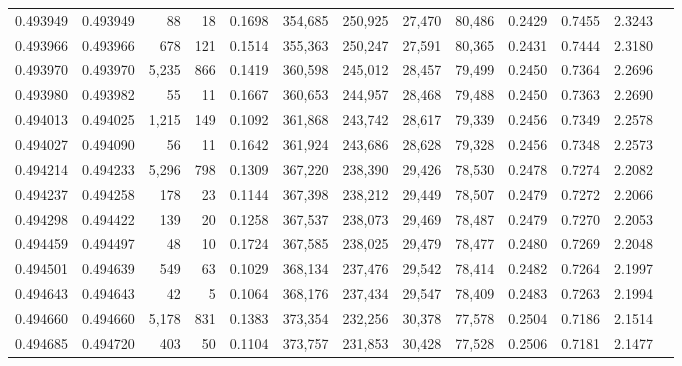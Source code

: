 \begin{tabular}{rrrrrrrrrrrrr}
0.493949 & 0.493949 &    88 &    18 &                                     0.1698 & 354,685 & 250,925 &  27,470 &  80,486 & 0.2429 & 0.7455 & 2.3243 \\
0.493966 & 0.493966 &   678 &   121 &                                     0.1514 & 355,363 & 250,247 &  27,591 &  80,365 & 0.2431 & 0.7444 & 2.3180 \\
0.493970 & 0.493970 & 5,235 &   866 &                                     0.1419 & 360,598 & 245,012 &  28,457 &  79,499 & 0.2450 & 0.7364 & 2.2696 \\
0.493980 & 0.493982 &    55 &    11 &                                     0.1667 & 360,653 & 244,957 &  28,468 &  79,488 & 0.2450 & 0.7363 & 2.2690 \\
0.494013 & 0.494025 & 1,215 &   149 &                                     0.1092 & 361,868 & 243,742 &  28,617 &  79,339 & 0.2456 & 0.7349 & 2.2578 \\
0.494027 & 0.494090 &    56 &    11 &                                     0.1642 & 361,924 & 243,686 &  28,628 &  79,328 & 0.2456 & 0.7348 & 2.2573 \\
0.494214 & 0.494233 & 5,296 &   798 &                                     0.1309 & 367,220 & 238,390 &  29,426 &  78,530 & 0.2478 & 0.7274 & 2.2082 \\
0.494237 & 0.494258 &   178 &    23 &                                     0.1144 & 367,398 & 238,212 &  29,449 &  78,507 & 0.2479 & 0.7272 & 2.2066 \\
0.494298 & 0.494422 &   139 &    20 &                                     0.1258 & 367,537 & 238,073 &  29,469 &  78,487 & 0.2479 & 0.7270 & 2.2053 \\
0.494459 & 0.494497 &    48 &    10 &                                     0.1724 & 367,585 & 238,025 &  29,479 &  78,477 & 0.2480 & 0.7269 & 2.2048 \\
0.494501 & 0.494639 &   549 &    63 &                                     0.1029 & 368,134 & 237,476 &  29,542 &  78,414 & 0.2482 & 0.7264 & 2.1997 \\
0.494643 & 0.494643 &    42 &     5 &                                     0.1064 & 368,176 & 237,434 &  29,547 &  78,409 & 0.2483 & 0.7263 & 2.1994 \\
0.494660 & 0.494660 & 5,178 &   831 &                                     0.1383 & 373,354 & 232,256 &  30,378 &  77,578 & 0.2504 & 0.7186 & 2.1514 \\
0.494685 & 0.494720 &   403 &    50 &                                     0.1104 & 373,757 & 231,853 &  30,428 &  77,528 & 0.2506 & 0.7181 & 2.1477 \\

\end{tabular}
